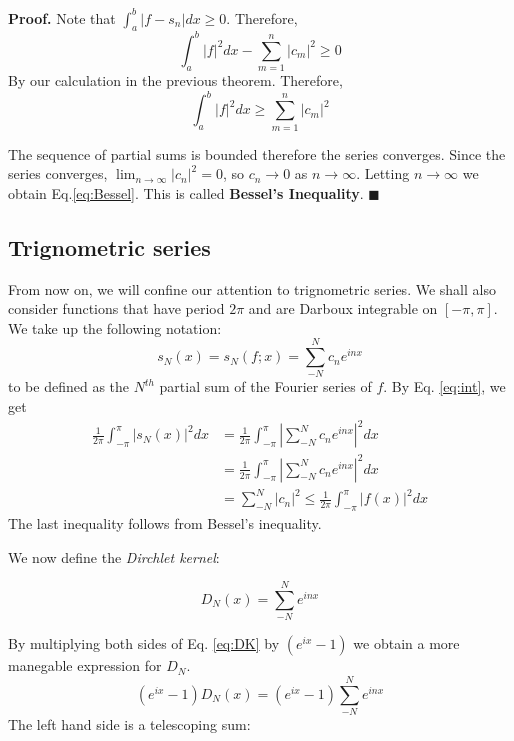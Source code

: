 \documentclass{article}
\begin{document}
\textbf{Proof.} Note that $\int_a^b |f-s_n| dx \geq 0$.  Therefore,
\begin{equation}
\int_a^b|f|^2dx - \sum_{m=1}^n |c_m|^2 \geq 0
\end{equation}
By our calculation in the previous theorem.  Therefore,
\begin{equation}
\int_a^b|f|^2dx \geq \sum_{m=1}^n |c_m|^2 
\end{equation}

The sequence of partial sums is bounded therefore the series converges. Since the series converges, $\lim_{n\rightarrow \infty} |c_n|^2=0 $, so $c_n\rightarrow 0$ as $n\rightarrow \infty$.  Letting $n\rightarrow \infty$  we obtain Eq.\ref{eq:Bessel}. This is called \textbf{Bessel's Inequality}.  $\blacksquare$

\subsection{Trignometric series}
From now on, we will confine our attention to trignometric series.  We shall also consider functions that have period $2\pi$ and are Darboux integrable on $[-\pi,\pi]$.  We take up the following notation:
\begin{equation}
s_N(x) = s_N(f;x)=\sum_{-N}^N c_n e^{inx}
\end{equation}
to be defined as the $N^{th}$ partial sum of the Fourier series of $f$.  By Eq. \ref{eq:int}, we get 
\begin{align}
\frac{1}{2\pi} \int_{-\pi}^{\pi} |s_N(x)|^2 dx &= \frac{1}{2\pi} \int_{-\pi}^\pi \left|\sum_{-N}^N c_ne^{inx}\right|^2 dx\\
							&= \frac{1}{2\pi} \int_{-\pi}^\pi \left|\sum_{-N}^N c_ne^{inx}\right|^2 dx\\
							&=\sum_{-N}^N |c_n|^2\leq \frac{1}{2\pi}\int_{-\pi}^\pi |f(x)|^2 dx
\end{align}
The last inequality follows from Bessel's inequality.


We now define the \emph{Dirchlet kernel}:

\begin{equation}
\label{eq:DK}
D_N(x) = \sum_{-N}^N e^{inx}
\end{equation}

By multiplying both sides of  Eq. \ref{eq:DK} by $(e^{ix}-1)$ we obtain a more manegable expression for $D_N$.
\begin{equation}
\label{eq:DN}
(e^{ix}-1)D_N(x) = (e^{ix}-1)\sum_{-N}^N e^{inx}
\end{equation}
The left hand side is a telescoping sum:
\end{document}
